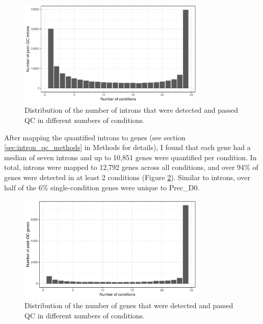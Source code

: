 \begin{figure}[H]
  \centering
  \includegraphics[width=0.8\textwidth]{dist_intron_num}
  \caption[Number of introns that passed QC versus the number of conditions where introns passed QC]{Distribution of the number of introns that were detected and passed QC in different numbers of conditions.}
  \label{fig:dist_intron_num}   
\end{figure}
After mapping the quantified introns to genes (see section \ref{sec:intron_qc_methods} in Methods for details), I found that each gene had a median of seven introns and up to 10,851 genes were quantified per condition. In total, introns were mapped to 12,792 genes across all conditions, and over 94\% of genes were detected in at least 2 conditions (Figure \ref{fig:dist_gene_num}). Similar to introns, over half of the 6\% single-condition genes were unique to Prec\_D0.

\begin{figure}[H]
  \centering
  \includegraphics[width=0.8\textwidth]{dist_gene_num}
  \caption[Number of genes with introns that passed QC versus the number of conditions where genes passed QC]{Distribution of the number of genes that were detected and passed QC in different numbers of conditions.}
  \label{fig:dist_gene_num}   
\end{figure}

